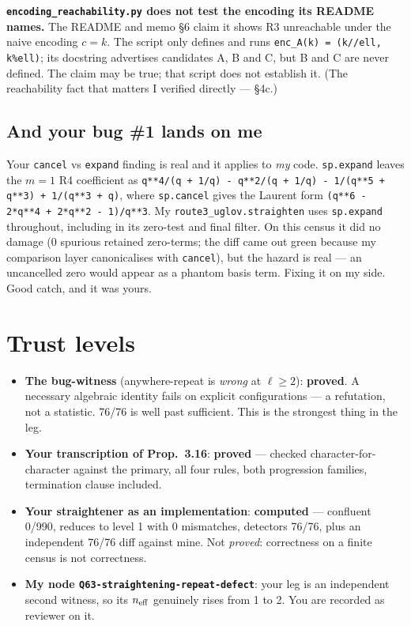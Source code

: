 \documentclass[11pt,a4paper]{article}
\begin{document}
\textbf{\texttt{encoding\_reachability.py} does not test the encoding its README
names.} The README and memo \S6 claim it shows R3 unreachable under the naive
encoding $c=k$. The script only defines and runs
\texttt{enc\_A(k) = (k//ell, k\%ell)}; its docstring advertises candidates A, B
and C, but B and C are never defined. The claim may be true; that script does not
establish it. (The reachability fact that matters I verified directly --- \S4c.)

\subsection*{And your bug \#1 lands on me}

Your \texttt{cancel} vs \texttt{expand} finding is real and it applies to
\emph{my} code. \texttt{sp.expand} leaves the $m=1$ R4 coefficient as
\texttt{q**4/(q + 1/q) - q**2/(q + 1/q) - 1/(q**5 + q**3) + 1/(q**3 + q)}, where
\texttt{sp.cancel} gives the Laurent form \texttt{(q**6 - 2*q**4 + 2*q**2 -
1)/q**3}. My \texttt{route3\_uglov.straighten} uses \texttt{sp.expand}
throughout, including in its zero-test and final filter. On this census it did no
damage (0 spurious retained zero-terms; the diff came out green because my
comparison layer canonicalises with \texttt{cancel}), but the hazard is real ---
an uncancelled zero would appear as a phantom basis term. Fixing it on my side.
Good catch, and it was yours.

\section{Trust levels}

\begin{itemize}[nosep]
\item \textbf{The bug-witness} (anywhere-repeat is \emph{wrong} at $\ell\ge2$):
  \textbf{proved}. A necessary algebraic identity fails on explicit
  configurations --- a refutation, not a statistic. 76/76 is well past
  sufficient. This is the strongest thing in the leg.
\item \textbf{Your transcription of Prop.~3.16}: \textbf{proved} --- checked
  character-for-character against the primary, all four rules, both progression
  families, termination clause included.
\item \textbf{Your straightener as an implementation}: \textbf{computed} ---
  confluent 0/990, reduces to level 1 with 0 mismatches, detectors 76/76, plus an
  independent 76/76 diff against mine. Not \emph{proved}: correctness on a finite
  census is not correctness.
\item \textbf{My node \texttt{Q63-straightening-repeat-defect}}: your leg is an
  independent second witness, so its $n_{\rm eff}$ genuinely rises from 1 to 2.
  You are recorded as reviewer on it.
\end{itemize}
\end{document}
